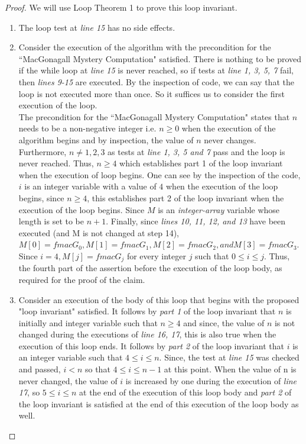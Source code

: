\documentclass[12pt]{article}
\begin{document}
\begin{proof}
We will use Loop Theorem 1 to prove this loop invariant.
\begin{enumerate}
    \item The loop test at \textit{line 15} has no side effects. 
    \item Consider the execution of the algorithm with the precondition for the ``MacGonagall Mystery Computation" satisfied. There is nothing to be proved if the while loop at \textit{line 15} is never reached, so if tests at \textit{line 1, 3, 5, 7} fail, then \textit{lines 9-15} are executed. By the inspection of code, we can say that the loop is not executed more than once. So it suffices us to consider the first execution of the loop. 
    \\
    The precondition for the ``MacGonagall Mystery Computation" states that $n$ needs to be a non-negative integer i.e. $n \geq 0$ when the execution of the algorithm begins and by inspection, the value of $n$ never changes. Furthermore, $n \neq 1,2,3$ as tests at \textit{line 1, 3, 5 and 7} pass and the loop is never reached. Thus, $n \geq 4$ which establishes part 1 of the loop invariant when the execution of loop begins. One can see by the inspection of the code, $i$ is an integer variable with a value of $4$ when the execution of the loop begins, since $n \geq 4$, this establishes part 2 of the loop invariant when the execution of the loop begins. Since $M$ is an \textit{integer-array} variable whose length is set to be $n+1$. Finally, since \emph{lines 10, 11, 12, and 13} have been executed (and M is not changed at step 14), $M[0] = fmacG_{0}, M[1] = fmacG_{1}, M[2] = fmacG_{2}, and M[3] = fmacG_{3}$. Since $i=4, M[j] = fmacG_{j}$ for every integer $j$ such that $0 \leq i \leq j$. Thus, the fourth part of the assertion before the execution of the loop body, as required for the proof of the claim.
    
    \item Consider an execution of the body of this loop that begins with the proposed "loop invariant" satisfied. It follows by \emph{part 1} of the loop invariant that $n$ is initially and integer variable such that $n \geq 4$ and since, the value of $n$ is not changed during the executions of \emph{line 16, 17}, this is also true when the execution of this loop ends. It follows by \emph{part 2} of the loop invariant that $i$ is an integer variable such that $4 \leq i \leq n$. Since, the test at \emph{line 15} was checked and passed, $i < n$ so that $4 \leq i \leq n-1$ at this point.
    When the value of n is never changed, the value of $i$ is increased by one during the execution of \emph{line 17}, so $5 \leq i \leq n$ at the end of the execution of this loop body and \emph{part 2} of the loop invariant is satisfied at the end of this execution of the loop body as well.
    
   \end{enumerate}
\end{proof}
\end{document}
